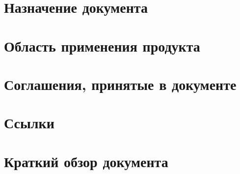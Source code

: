 
\section{Назначение документа}


\section{Область применения продукта}


\section{Соглашения, принятые в документе}  %


\section{Ссылки}


\section{Краткий обзор документа}
